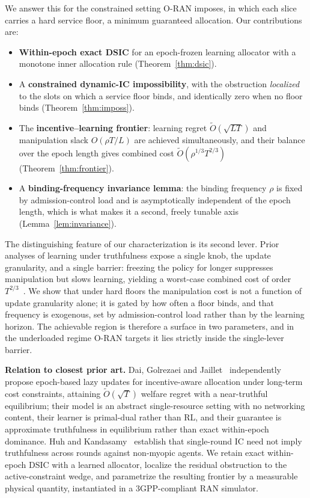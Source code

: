 \documentclass[conference]{IEEEtran}
\theoremstyle{definition}
\theoremstyle{remark}
\newcommand{\Slots}{T}
\newcommand{\Ep}{L}
\newcommand{\rhobind}{\rho}
\newcommand{\Otil}{\tilde{O}}
\begin{document}
We answer this for the constrained setting O-RAN imposes, in which each slice carries a hard service floor, a minimum guaranteed allocation. Our contributions are:
\begin{itemize}
\item \textbf{Within-epoch exact DSIC} for an epoch-frozen learning allocator with a monotone inner allocation rule (Theorem~\ref{thm:dsic}).
\item A \textbf{constrained dynamic-IC impossibility}, with the obstruction \emph{localized} to the slots on which a service floor binds, and identically zero when no floor binds (Theorem~\ref{thm:imposs}).
\item The \textbf{incentive--learning frontier}: learning regret $\Otil(\sqrt{\Ep\Slots})$ and manipulation slack $O(\rhobind\Slots/\Ep)$ are achieved simultaneously, and their balance over the epoch length gives combined cost $\Otil(\rhobind^{1/3}\Slots^{2/3})$ (Theorem~\ref{thm:frontier}).
\item A \textbf{binding-frequency invariance lemma}: the binding frequency $\rhobind$ is fixed by admission-control load and is asymptotically independent of the epoch length, which is what makes it a second, freely tunable axis (Lemma~\ref{lem:invariance}).
\end{itemize}

The distinguishing feature of our characterization is its second lever. Prior analyses of learning under truthfulness expose a single knob, the update granularity, and a single barrier: freezing the policy for longer suppresses manipulation but slows learning, yielding a worst-case combined cost of order $\Slots^{2/3}$~\cite{ref:dai,ref:dekel}. We show that under hard floors the manipulation cost is not a function of update granularity alone; it is gated by how often a floor binds, and that frequency is exogenous, set by admission-control load rather than by the learning horizon. The achievable region is therefore a surface in two parameters, and in the underloaded regime O-RAN targets it lies strictly inside the single-lever barrier.

\textbf{Relation to closest prior art.} Dai, Golrezaei and Jaillet~\cite{ref:dai} independently propose epoch-based lazy updates for incentive-aware allocation under long-term cost constraints, attaining $\Otil(\sqrt{\Slots})$ welfare regret with a near-truthful equilibrium; their model is an abstract single-resource setting with no networking content, their learner is primal-dual rather than RL, and their guarantee is approximate truthfulness in equilibrium rather than exact within-epoch dominance. Huh and Kandasamy~\cite{ref:huh} establish that single-round IC need not imply truthfulness across rounds against non-myopic agents. We retain exact within-epoch DSIC with a learned allocator, localize the residual obstruction to the active-constraint wedge, and parametrize the resulting frontier by a measurable physical quantity, instantiated in a 3GPP-compliant RAN simulator.
\end{document}
